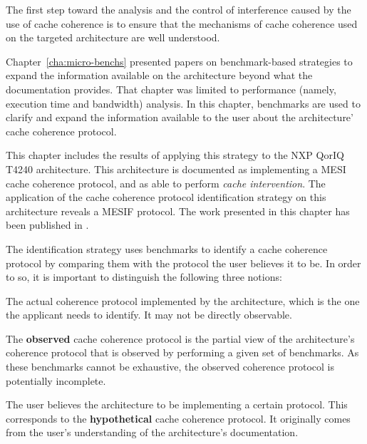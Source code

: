 The first step toward the analysis and the control of interference caused by
the use of cache coherence is to ensure that the mechanisms of cache coherence
used on the targeted architecture are well understood.

Chapter~\ref{cha:micro-benchs} presented papers on benchmark-based strategies to
expand the information available on the architecture beyond what the
documentation provides. That chapter was limited to performance (namely,
execution time and bandwidth) analysis. In this chapter, benchmarks are used to
clarify and expand the information available to the user about the architecture'
cache coherence protocol.

This chapter includes the results of applying this strategy to the NXP QorIQ
T4240 architecture. This architecture is documented as implementing a MESI cache
coherence protocol, and as able to perform \textit{cache intervention}. The
application of the cache coherence protocol identification strategy on this
architecture reveals a MESIF protocol. The work presented in this chapter has
been published in \cite{ecrts20}.

The identification strategy uses benchmarks to identify a cache coherence
protocol by comparing them with the protocol the user believes it to be. In
order to so, it is important to distinguish the following three notions:
\begin{definition}
The actual coherence protocol implemented by the architecture, which is the one
the applicant needs to identify. It may not be directly observable.
\end{definition}

\begin{definition}
The \textbf{observed} cache coherence protocol is the partial view of the
architecture's coherence protocol that is observed by performing a given set of
benchmarks. As these benchmarks cannot be exhaustive, the observed coherence
protocol is potentially incomplete.
\end{definition}

\begin{definition}
The user believes the architecture to be implementing a certain protocol. This
corresponds to the \textbf{hypothetical} cache coherence protocol. It originally
comes from the user's understanding of the architecture's documentation.
\end{definition}

